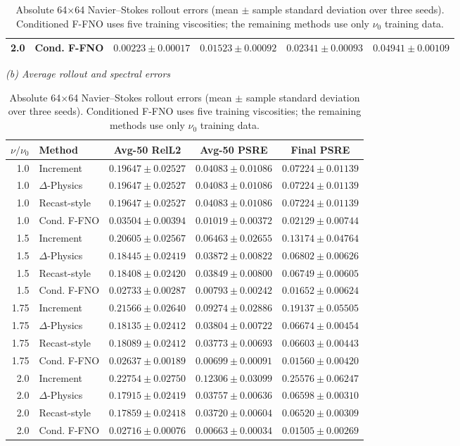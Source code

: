 \begin{table}[!htbp]
\begin{tabular}{@{}rlcccc@{}}
2.0 & Cond. F-FNO & $0.00223\pm0.00017$ & $0.01523\pm0.00092$ & $0.02341\pm0.00093$ & $0.04941\pm0.00109$ \\
\bottomrule
\end{tabular}\par\medskip
\textit{(b) Average rollout and spectral errors}\par\smallskip
\begin{tabular}{@{}rlccc@{}}
\toprule
$\nu/\nu_0$ & Method & Avg-50 RelL2 & Avg-50 PSRE & Final PSRE \\
\midrule
1.0 & Increment & $0.19647\pm0.02527$ & $0.04083\pm0.01086$ & $0.07224\pm0.01139$ \\
1.0 & $\Delta$-Physics & $0.19647\pm0.02527$ & $0.04083\pm0.01086$ & $0.07224\pm0.01139$ \\
1.0 & Recast-style & $0.19647\pm0.02527$ & $0.04083\pm0.01086$ & $0.07224\pm0.01139$ \\
1.0 & Cond. F-FNO & $0.03504\pm0.00394$ & $0.01019\pm0.00372$ & $0.02129\pm0.00744$ \\
1.5 & Increment & $0.20605\pm0.02567$ & $0.06463\pm0.02655$ & $0.13174\pm0.04764$ \\
1.5 & $\Delta$-Physics & $0.18445\pm0.02419$ & $0.03872\pm0.00822$ & $0.06802\pm0.00626$ \\
1.5 & Recast-style & $0.18408\pm0.02420$ & $0.03849\pm0.00800$ & $0.06749\pm0.00605$ \\
1.5 & Cond. F-FNO & $0.02733\pm0.00287$ & $0.00793\pm0.00242$ & $0.01652\pm0.00624$ \\
1.75 & Increment & $0.21566\pm0.02640$ & $0.09274\pm0.02886$ & $0.19137\pm0.05505$ \\
1.75 & $\Delta$-Physics & $0.18135\pm0.02412$ & $0.03804\pm0.00722$ & $0.06674\pm0.00454$ \\
1.75 & Recast-style & $0.18089\pm0.02412$ & $0.03773\pm0.00693$ & $0.06603\pm0.00443$ \\
1.75 & Cond. F-FNO & $0.02637\pm0.00189$ & $0.00699\pm0.00091$ & $0.01560\pm0.00420$ \\
2.0 & Increment & $0.22754\pm0.02750$ & $0.12306\pm0.03099$ & $0.25576\pm0.06247$ \\
2.0 & $\Delta$-Physics & $0.17915\pm0.02419$ & $0.03757\pm0.00636$ & $0.06598\pm0.00310$ \\
2.0 & Recast-style & $0.17859\pm0.02418$ & $0.03720\pm0.00604$ & $0.06520\pm0.00309$ \\
2.0 & Cond. F-FNO & $0.02716\pm0.00076$ & $0.00663\pm0.00034$ & $0.01505\pm0.00269$ \\
\bottomrule
\end{tabular}\par\medskip
\caption{Absolute 64$\times$64 Navier--Stokes rollout errors (mean $\pm$ sample standard deviation over three seeds). Conditioned F-FNO uses five training viscosities; the remaining methods use only $\nu_0$ training data.}
\label{tab:ns64_absolute}
\end{table}
